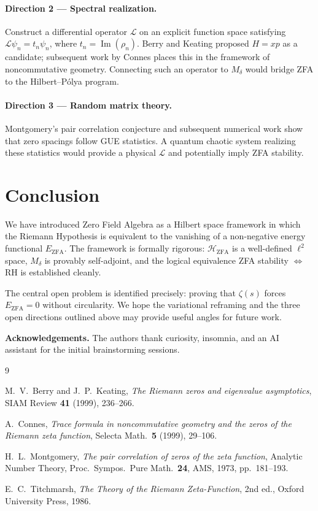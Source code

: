 \documentclass[12pt]{article}
\theoremstyle{definition}
\newcommand{\HZFA}{\mathcal{H}_{\mathrm{ZFA}}}
\newcommand{\EZFA}{E_{\mathrm{ZFA}}}
\newcommand{\Mdelta}{M_{\delta}}
\begin{document}
\paragraph{Direction 2 --- Spectral realization.}
Construct a differential operator $\mathcal{L}$ on an explicit
function space satisfying $\mathcal{L}\psi_n = t_n\psi_n$, where
$t_n = \operatorname{Im}(\rho_n)$.
Berry and Keating \cite{BK99} proposed $H = xp$ as a candidate;
subsequent work by Connes \cite{Co99} places this in the framework
of noncommutative geometry.
Connecting such an operator to $\Mdelta$ would bridge ZFA to the
Hilbert--P\'olya program.

\paragraph{Direction 3 --- Random matrix theory.}
Montgomery's pair correlation conjecture \cite{Mo73} and subsequent
numerical work show that zero spacings follow GUE statistics.
A quantum chaotic system realizing these statistics would provide a
physical $\mathcal{L}$ and potentially imply ZFA stability.

\section{Conclusion}

We have introduced Zero Field Algebra as a Hilbert space framework
in which the Riemann Hypothesis is equivalent to the vanishing of a
non-negative energy functional $\EZFA$.
The framework is formally rigorous: $\HZFA$ is a well-defined
$\ell^2$ space, $\Mdelta$ is provably self-adjoint, and the
logical equivalence ZFA stability $\iff$ RH is established cleanly.

The central open problem is identified precisely: proving that
$\zeta(s)$ forces $\EZFA = 0$ without circularity.
We hope the variational reframing and the three open directions
outlined above may provide useful angles for future work.

\medskip
\noindent\textbf{Acknowledgements.}
The authors thank curiosity, insomnia, and an AI assistant for
the initial brainstorming sessions.

\begin{thebibliography}{9}

M.~V.~Berry and J.~P.~Keating,
\emph{The Riemann zeros and eigenvalue asymptotics},
SIAM Review \textbf{41} (1999), 236--266.

A.~Connes,
\emph{Trace formula in noncommutative geometry and the zeros of the
Riemann zeta function},
Selecta Math.\ \textbf{5} (1999), 29--106.

H.~L.~Montgomery,
\emph{The pair correlation of zeros of the zeta function},
Analytic Number Theory, Proc.\ Sympos.\ Pure Math.\ \textbf{24},
AMS, 1973, pp.~181--193.

E.~C.~Titchmarsh,
\emph{The Theory of the Riemann Zeta-Function},
2nd ed., Oxford University Press, 1986.

\end{thebibliography}
\end{document}
